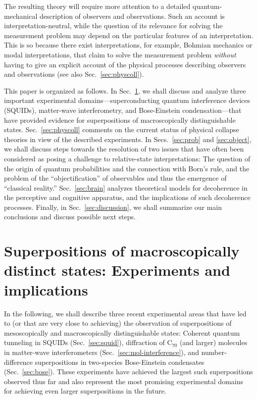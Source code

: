 \documentclass[12pt,aps,floatfix,amsmath,amssymb,showpacs,nofootinbib]{revtex4-2}
\begin{document}
The resulting theory will require more attention to a detailed
quantum-mechanical description of observers and observations. Such an
account is interpretation-neutral, while the question of its relevance
for solving the measurement problem may depend on the particular
features of an interpretation. This is so because there exist
interpretations, for example, Bohmian mechanics or modal
interpretations, that claim to solve the measurement problem
\emph{without} having to give an explicit account of the physical
processes describing observers and observations (see also
Sec.~\ref{sec:physcoll}).

This paper is organized as follows. In Sec.~\ref{sec:experiments}, we
shall discuss and analyze three important experimental
domains---superconducting quantum interference devices (SQUIDs),
matter-wave interferometry, and Bose-Einstein condensation---that have
provided evidence for superpositions of macroscopically
distinguishable states. Sec.~\ref{sec:physcoll} comments on the
current status of physical collapse theories in view of the described
experiments.  In Secs.~\ref{sec:prob} and \ref{sec:object}, we shall
discuss steps towards the resolution of two issues that have often
been considered as posing a challenge to relative-state
interpretations: The question of the origin of quantum probabilities
and the connection with Born's rule, and the problem of the
``objectification'' of observables and thus the emergence of
``classical reality.''  Sec.~\ref{sec:brain} analyzes theoretical
models for decoherence in the perceptive and cognitive apparatus, and
the implications of such decoherence processes.  Finally, in
Sec.~\ref{sec:discussion}, we shall summarize our main conclusions and
discuss possible next steps.


\section{Superpositions of macroscopically
  distinct states: Experiments and
  implications}\label{sec:experiments}

In the following, we shall describe three recent experimental areas
that have led to (or that are very close to achieving) the observation
of superpositions of mesoscopically and macroscopically
distinguishable states: Coherent quantum tunneling in SQUIDs
(Sec.~\ref{sec:squid}), diffraction of C$_{70}$ (and larger) molecules
in matter-wave interferometers (Sec.~\ref{sec:mol-interference}), and
number-difference superpositions in two-species Bose-Einstein
condensates (Sec.~\ref{sec:bose}).  These experiments have achieved
the largest such superpositions observed thus far and also represent
the most promising experimental domains for achieving even larger
superpositions in the future.
\end{document}
